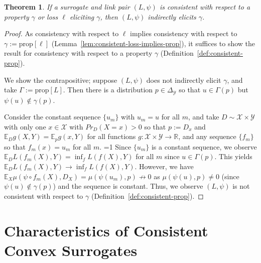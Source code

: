 \documentclass{article}
\newcommand{\Comments}{1}
\newcommand{\mynote}[2]{\ifnum\Comments=1\textcolor{#1}{#2}\fi}
\newcommand{\mytodo}[2]{\ifnum\Comments=1%
	\todo[linecolor=#1!80!black,backgroundcolor=#1,bordercolor=#1!80!black]{#2}\fi}
\newcommand{\raft}[1]{\mytodo{green!20!white}{RF: #1}}
\newcommand{\jessie}[1]{\mynote{purple}{[JF: #1]}}
\newcommand{\reals}{\mathbb{R}}
\newcommand{\simplex}{\Delta_\Y}
\newcommand{\prop}[1]{\mathrm{prop}[#1]}
\newcommand{\propdis}{\mu}
\newcommand{\E}{\mathbb{E}}
\newcommand{\X}{\mathcal{X}}
\newcommand{\Y}{\mathcal{Y}}
\newtheorem{theorem}{Theorem}
\begin{document}
\begin{theorem}\label{thm:consistent-implies-indir-elic}
	If a surrogate and link pair $(L, \psi)$ is consistent with respect to a property $\gamma$ or loss $\ell$ eliciting $\gamma$, then $(L, \psi)$ indirectly elicits $\gamma$.
\end{theorem}
\begin{proof}
	As consistency with respect to $\ell$ implies consistency with respect to $\gamma := \prop{\ell}$ (Lemma~\ref{lem:consistent-loss-implies-prop}), it suffices to show the result for consistency with respect to a property $\gamma$ (Definition~\ref{def:consistent-prop}).
  
	We show the contrapositive; suppose $(L, \psi)$ does not indirectly elicit $\gamma$, and take $\Gamma := \prop{L}$.
	Then there is a distribution $p \in \simplex$ so that $u \in \Gamma(p)$ but $\psi(u) \not \in \gamma(p)$.

	Consider the constant sequence $\{u_m\}$ with $u_m = u$ for all $m$, and take $D \sim \X \times\Y$ with only one $x \in \X$ with $Pr_D(X = x) > 0$ so that $p := D_x$ and $\E_D g(X,Y) = \E_p g(x, Y)$ for all functions $g : \X \times \Y \to \reals$, and any sequence $\{f_m\}$ so that $f_m(x) = u_m$ for all $m$.
  \raft{Check $D$ wording here too \jessie{better?}}
  	Since $\{u_m\}$ is a constant sequence, we observe $\E_D L(f_m(X), Y) = \inf_f L(f(X),Y)$ for all $m$ since $u \in \Gamma(p)$.
	This yields $\E_D L(f_m(X), Y) \to \inf_f L(f(X),Y)$.
	However, we have $\E_X \propdis(\psi \circ f_m(X), D_X) = \propdis(\psi(u_m), p) \not \to 0$ as $\propdis(\psi(u), p) \neq 0$ (since $\psi(u) \not \in \gamma(p)$) and the sequence is constant.
	Thus, we observe $(L, \psi)$ is not consistent with respect to $\gamma$ (Definition~\ref{def:consistent-prop}).
\end{proof}

\section{Characteristics of Consistent Convex Surrogates}\label{sec:char-convex}
\end{document}
